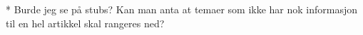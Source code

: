 * Burde jeg se på stubs? 
Kan man anta at temaer som ikke har nok informasjon til en hel artikkel skal rangeres ned?